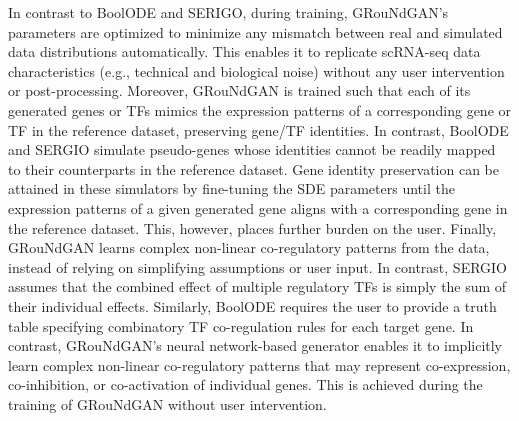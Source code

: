 In contrast to BoolODE and SERIGO, during training, GRouNdGAN’s parameters are optimized to minimize any mismatch between real and simulated data distributions automatically. This enables it to replicate scRNA-seq data characteristics (e.g., technical and biological noise) without any user intervention or post-processing. Moreover, GRouNdGAN is trained such that each of its generated genes or TFs mimics the expression patterns of a corresponding gene or TF in the reference dataset, preserving gene/TF identities. In contrast, BoolODE and SERGIO simulate pseudo-genes whose identities cannot be readily mapped to their counterparts in the reference dataset. Gene identity preservation can be attained in these simulators by fine-tuning the SDE parameters until the expression patterns of a given generated gene aligns with a corresponding gene in the reference dataset. This, however, places further burden on the user. Finally, GRouNdGAN learns complex non-linear co-regulatory patterns from the data, instead of relying on simplifying assumptions or user input. In contrast, SERGIO assumes that the combined effect of multiple regulatory TFs is simply the sum of their individual effects. Similarly, BoolODE requires the user to provide a truth table specifying combinatory TF co-regulation rules for each target gene. In contrast, GRouNdGAN’s neural network-based generator enables it to implicitly learn complex non-linear co-regulatory patterns that may represent co-expression, co-inhibition, or co-activation of individual genes. This is achieved during the training of GRouNdGAN without user intervention.

